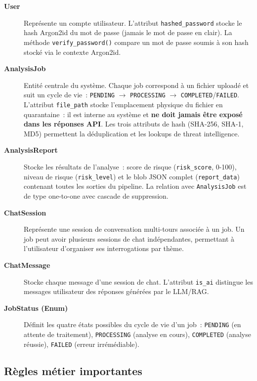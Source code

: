 \begin{description}
  \item[\textbf{User}] Représente un compte utilisateur. L'attribut \texttt{hashed\_password} stocke le hash Argon2id du mot de passe (jamais le mot de passe en clair). La méthode \texttt{verify\_password()} compare un mot de passe soumis à son hash stocké via le contexte Argon2id.

  \item[\textbf{AnalysisJob}] Entité centrale du système. Chaque job correspond à un fichier uploadé et suit un cycle de vie~: \texttt{PENDING} $\rightarrow$ \texttt{PROCESSING} $\rightarrow$ \texttt{COMPLETED}/\texttt{FAILED}. L'attribut \texttt{file\_path} stocke l'emplacement physique du fichier en quarantaine~: il est interne au système et \textbf{ne doit jamais être exposé dans les réponses API}. Les trois attributs de hash (SHA-256, SHA-1, MD5) permettent la déduplication et les lookups de threat intelligence.

  \item[\textbf{AnalysisReport}] Stocke les résultats de l'analyse~: score de risque (\texttt{risk\_score}, 0-100), niveau de risque (\texttt{risk\_level}) et le blob JSON complet (\texttt{report\_data}) contenant toutes les sorties du pipeline. La relation avec \texttt{AnalysisJob} est de type one-to-one avec cascade de suppression.

  \item[\textbf{ChatSession}] Représente une session de conversation multi-tours associée à un job. Un job peut avoir plusieurs sessions de chat indépendantes, permettant à l'utilisateur d'organiser ses interrogations par thème.

  \item[\textbf{ChatMessage}] Stocke chaque message d'une session de chat. L'attribut \texttt{is\_ai} distingue les messages utilisateur des réponses générées par le LLM/RAG.

  \item[\textbf{JobStatus (Enum)}] Définit les quatre états possibles du cycle de vie d'un job~: \texttt{PENDING} (en attente de traitement), \texttt{PROCESSING} (analyse en cours), \texttt{COMPLETED} (analyse réussie), \texttt{FAILED} (erreur irrémédiable).
\end{description}

\subsection{Règles métier importantes}

